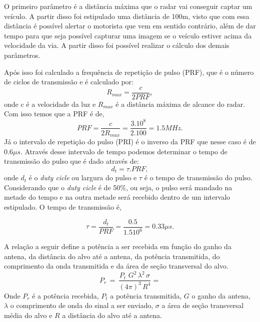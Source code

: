 O primeiro parâmetro é a distância máxima que o radar vai conseguir captar um veículo. A partir disso foi estipulado uma distância de 100m, visto que com essa distância é possível alertar o motorista que vem em sentido contrário, além de dar tempo para que seja possível capturar uma imagem se o veículo estiver acima da velocidade da via. A partir disso foi possível realizar o cálculo dos demais parâmetros.

Após isso foi calculado a frequência de repetição de pulso (PRF), que é o número de ciclos de transmissão e é calculado por:
\begin{equation}\label{R_MAX}
    R_{max} =  \frac{c}{2PRF},
\end{equation}
onde c é a velocidade da luz e $R_{max}$ é a distância máxima de alcance do radar. Com isso temos que a PRF é de,
\begin{equation}\label{PRF}
  PRF =  \frac{c}{2R_{max}} = \frac{3.10^8}{2.100} = 1.5MHz.
\end{equation}
Já o intervalo de repetição do pulso (PRI) é o inverso da PRF que nesse caso é de $0.6\mu s$. Através desse intervalo de tempo podemos determinar o tempo de transmissão do pulso que é dado através de: 
\begin{equation}\label{duty}
  d_t = \tau . PRF,
\end{equation}
onde $d_t$ é o \emph{duty cicle} ou largura do pulso e $\tau$ é o tempo de transmissão do pulso. Considerando que o \emph{duty cicle} é de 50$\%$, ou seja, o pulso será mandado na metade do tempo e na outra metade será recebido dentro de um intervalo estipulado. O tempo de transmissão é,

\begin{equation}\label{tal}
  \tau = \frac{d_t}{PRF} =  \frac{0.5}{1.510^6} = 0.33\mu s.
\end{equation}


A relação a seguir define a potência a ser recebida em função do ganho da antena, da distância do alvo até a antena, da potência transmitida, do comprimento da onda transmitida e da área de seção transversal do alvo.
\begin{equation}\label{potencia_recebida}
    P_r\, =\,    \frac{P_{t}\,\, G^{2}\,   \lambda^{2}\, \sigma }{(4\pi)^{3}\,  R^{4}} = 
\end{equation}%
Onde $P_r$ é a potência recebida, $P_t$ a potência transmitida, $G$ o ganho da antena, $\lambda$ o comprimento de onda do sinal a ser enviado, $\sigma$ a área de seção transversal média do alvo e $R$ a distância do alvo até a antena.

